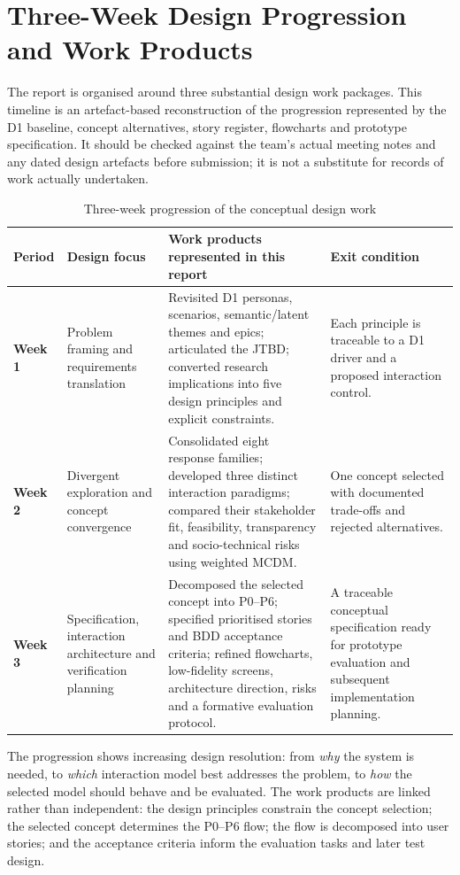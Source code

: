 \documentclass[12pt,a4paper]{article}
\begin{document}
\section{Three-Week Design Progression and Work Products}

The report is organised around three substantial design work packages. This timeline is an artefact-based reconstruction of the progression represented by the D1 baseline, concept alternatives, story register, flowcharts and prototype specification. It should be checked against the team's actual meeting notes and any dated design artefacts before submission; it is not a substitute for records of work actually undertaken.

\begin{table}[ht]
\centering
\small
\caption{Three-week progression of the conceptual design work}
\label{tab:three-week}
\begin{tabularx}{\textwidth}{@{}p{1.5cm}p{3.2cm}Xp{3.2cm}@{}}
\toprule
\textbf{Period} & \textbf{Design focus} & \textbf{Work products represented in this report} & \textbf{Exit condition}\\
\midrule
\textbf{Week 1} & Problem framing and requirements translation & Revisited D1 personas, scenarios, semantic/latent themes and epics; articulated the JTBD; converted research implications into five design principles and explicit constraints. & Each principle is traceable to a D1 driver and a proposed interaction control.\\
\rowcolor{brandlight}
\textbf{Week 2} & Divergent exploration and concept convergence & Consolidated eight response families; developed three distinct interaction paradigms; compared their stakeholder fit, feasibility, transparency and socio-technical risks using weighted MCDM. & One concept selected with documented trade-offs and rejected alternatives.\\
\textbf{Week 3} & Specification, interaction architecture and verification planning & Decomposed the selected concept into P0--P6; specified prioritised stories and BDD acceptance criteria; refined flowcharts, low-fidelity screens, architecture direction, risks and a formative evaluation protocol. & A traceable conceptual specification ready for prototype evaluation and subsequent implementation planning.\\
\bottomrule
\end{tabularx}
\end{table}

The progression shows increasing design resolution: from \emph{why} the system is needed, to \emph{which} interaction model best addresses the problem, to \emph{how} the selected model should behave and be evaluated. The work products are linked rather than independent: the design principles constrain the concept selection; the selected concept determines the P0--P6 flow; the flow is decomposed into user stories; and the acceptance criteria inform the evaluation tasks and later test design.
\end{document}
